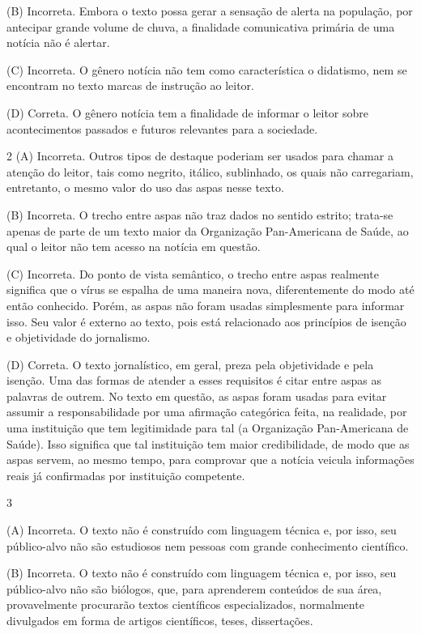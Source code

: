(B) Incorreta. Embora o
texto possa gerar a sensação de alerta na população, por antecipar
grande volume de chuva, a finalidade comunicativa primária de uma
notícia não é alertar. 

(C) Incorreta. O gênero notícia não tem como
característica o didatismo, nem se encontram no texto marcas de
instrução ao leitor. 

(D) Correta. O gênero notícia tem a finalidade de
informar o leitor sobre acontecimentos passados e futuros relevantes
para a sociedade.

\num{2}
(A) Incorreta. Outros tipos de destaque poderiam ser usados para chamar
a atenção do leitor, tais como negrito, itálico, sublinhado, os quais
não carregariam, entretanto, o mesmo valor do uso das aspas nesse texto.

(B) Incorreta. O trecho entre aspas não traz dados no sentido estrito;
trata-se apenas de parte de um texto maior da Organização Pan-Americana
de Saúde, ao qual o leitor não tem acesso na notícia em questão. 

(C) Incorreta. Do ponto de vista semântico, o trecho entre aspas realmente
significa que o vírus se espalha de uma maneira nova, diferentemente do
modo até então conhecido. Porém, as aspas não foram usadas simplesmente
para informar isso. Seu valor é externo ao texto, pois está relacionado
aos princípios de isenção e objetividade do jornalismo. 

(D) Correta. O
texto jornalístico, em geral, preza pela objetividade e pela isenção.
Uma das formas de atender a esses requisitos é citar entre aspas as
palavras de outrem. No texto em questão, as aspas foram usadas para
evitar assumir a responsabilidade por uma afirmação categórica feita, na
realidade, por uma instituição que tem legitimidade para tal (a
Organização Pan-Americana de Saúde). Isso significa que tal instituição
tem maior credibilidade, de modo que as aspas servem, ao mesmo tempo,
para comprovar que a notícia veicula informações reais já confirmadas
por instituição competente.

\num{3}

(A) Incorreta. O texto não é construído com linguagem técnica e, por
isso, seu público-alvo não são estudiosos nem pessoas com grande
conhecimento científico.

(B) Incorreta. O texto não é construído com linguagem técnica e, por
isso, seu público-alvo não são biólogos, que, para aprenderem conteúdos
de sua área, provavelmente procurarão textos científicos especializados,
normalmente divulgados em forma de artigos científicos, teses,
dissertações.

